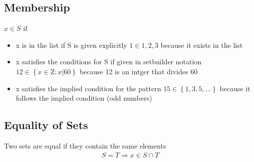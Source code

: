\documentclass{book/custombook}
\begin{document}
            \subsection{Membership}
               $x \in S$ if 
               \begin{itemize}
                   \item x is in the list if S is given explicitly
                       \subitem $1 \in {1,2,3}$ because it exists in the list
                   \item x satisfies the conditions for S if given in setbuilder notation
                        \subitem $12 \in \left\{ x \in \mathrm{Z} : x|60\right\}$ because 12 is an intger that divides
                        60
                   \item x satisfies the implied condition for the pattern
                       \subitem $15 \in \left\{1,3,5,...\right\}$ because it follows the implied condition (odd numbers)
               \end{itemize}
            \subsection{Equality of Sets}
                Two sets are equal if they contain the same elements
                    \begin{align*}
                        S = T \Rightarrow x \in S \cap T
                    \end{align*}
\end{document}
